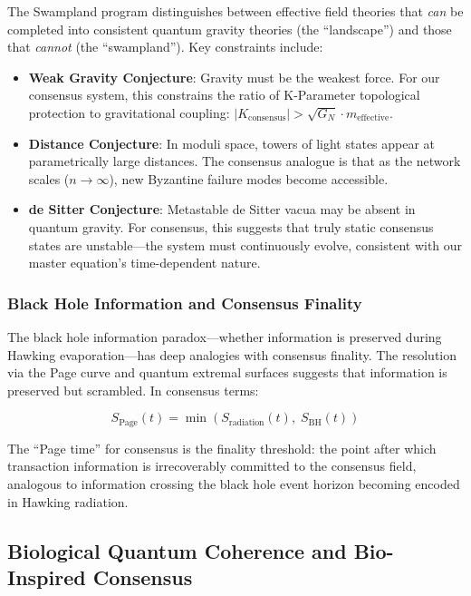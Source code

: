 \documentclass[11pt,a4paper]{article}
\begin{document}
The Swampland program \cite{vafa2005} distinguishes between effective field theories that \textit{can} be completed into consistent quantum gravity theories (the ``landscape'') and those that \textit{cannot} (the ``swampland''). Key constraints include:

\begin{itemize}
    \item \textbf{Weak Gravity Conjecture}: Gravity must be the weakest force. For our consensus system, this constrains the ratio of K-Parameter topological protection to gravitational coupling: $|K_{\text{consensus}}| > \sqrt{G_N} \cdot m_{\text{effective}}$.
    \item \textbf{Distance Conjecture}: In moduli space, towers of light states appear at parametrically large distances. The consensus analogue is that as the network scales ($n \to \infty$), new Byzantine failure modes become accessible.
    \item \textbf{de Sitter Conjecture}: Metastable de Sitter vacua may be absent in quantum gravity. For consensus, this suggests that truly static consensus states are unstable---the system must continuously evolve, consistent with our master equation's time-dependent nature.
\end{itemize}

\subsubsection{Black Hole Information and Consensus Finality}

The black hole information paradox---whether information is preserved during Hawking evaporation---has deep analogies with consensus finality. The resolution via the Page curve and quantum extremal surfaces \cite{maldacena1999} suggests that information is preserved but scrambled. In consensus terms:

\begin{equation}
S_{\text{Page}}(t) = \min\left(S_{\text{radiation}}(t),\; S_{\text{BH}}(t)\right)
\end{equation}

The ``Page time'' for consensus is the finality threshold: the point after which transaction information is irrecoverably committed to the consensus field, analogous to information crossing the black hole event horizon becoming encoded in Hawking radiation.

\subsection{Biological Quantum Coherence and Bio-Inspired Consensus}
\end{document}
